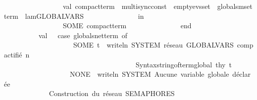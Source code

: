 \begin{isabellebody}
\ \ \ \ \ \ \ \ \ \ \ \ \ \ \ \ \ val\ compact{\isacharunderscore}{\kern0pt}term\ {\isacharequal}{\kern0pt}\ multisync{\isacharunderscore}{\kern0pt}const\ {\isachardollar}{\kern0pt}\ empty{\isacharunderscore}{\kern0pt}evs{\isacharunderscore}{\kern0pt}set\ {\isachardollar}{\kern0pt}\ globals{\isacharunderscore}{\kern0pt}mset{\isacharunderscore}{\kern0pt}term\ {\isachardollar}{\kern0pt}\ lam{\isacharunderscore}{\kern0pt}GLOBALVARS\isanewline
\ \ \ \ \ \ \ \ \ \ \ \ \ \ \ in\isanewline
\ \ \ \ \ \ \ \ \ \ \ \ \ \ \ \ \ SOME\ compact{\isacharunderscore}{\kern0pt}term\isanewline
\ \ \ \ \ \ \ \ \ \ \ \ \ \ \ end{\isacharparenright}{\kern0pt}\isanewline
\ \ \ \ \ \ \ \ \ \ \isanewline
\ \ \ \ \ \ \ \ \ \ val\ {\isacharunderscore}{\kern0pt}\ {\isacharequal}{\kern0pt}\ {\isacharparenleft}{\kern0pt}case\ globals{\isacharunderscore}{\kern0pt}net{\isacharunderscore}{\kern0pt}term\ of\isanewline
\ \ \ \ \ \ \ \ \ \ \ \ \ \ \ \ \ \ \ \ SOME\ t\ {\isacharequal}{\kern0pt}{\isachargreater}{\kern0pt}\ writeln\ {\isacharparenleft}{\kern0pt}{\isachardoublequote}{\kern0pt}{\isacharbrackleft}{\kern0pt}SYSTEM{\isacharbrackright}{\kern0pt}\ réseau\ GLOBALVARS\ compactifié\ {\isacharcolon}{\kern0pt}{\isacharbackslash}{\kern0pt}n\ \ {\isachardoublequote}{\kern0pt}\ {\isacharcircum}{\kern0pt}\isanewline
\ \ \ \ \ \ \ \ \ \ \ \ \ \ \ \ \ \ \ \ \ \ \ \ \ \ \ \ \ \ \ \ \ \ \ \ \ \ Syntax{\isachardot}{\kern0pt}string{\isacharunderscore}{\kern0pt}of{\isacharunderscore}{\kern0pt}term{\isacharunderscore}{\kern0pt}global\ thy{\isacharprime}{\kern0pt}\ t{\isacharparenright}{\kern0pt}\isanewline
\ \ \ \ \ \ \ \ \ \ \ \ \ \ \ \ \ \ {\isacharbar}{\kern0pt}\ NONE\ {\isacharequal}{\kern0pt}{\isachargreater}{\kern0pt}\ writeln\ {\isacharparenleft}{\kern0pt}{\isachardoublequote}{\kern0pt}{\isacharbrackleft}{\kern0pt}SYSTEM{\isacharbrackright}{\kern0pt}\ Aucune\ variable\ globale\ déclarée{\isachardoublequote}{\kern0pt}{\isacharparenright}{\kern0pt}{\isacharparenright}{\kern0pt}\isanewline
\ \ \ \ \ \ \ \ \ \ \isanewline
\ \ \ \ \ \ \ \ \ \ \isanewline
\isanewline
\ \ \ \ \ \ \ \ \ \ {\isacharparenleft}{\kern0pt}{\isacharasterisk}{\kern0pt}\ {}{\isachardot}{\kern0pt}\ \ Construction\ du\ réseau\ SEMAPHORES\ {\isacharminus}{\kern0pt}{\isacharminus}{\kern0pt}{\isacharminus}{\kern0pt}{\isacharminus}{\kern0pt}{\isacharminus}{\kern0pt}{\isacharminus}{\kern0pt}{\isacharminus}{\kern0pt}{\isacharminus}{\kern0pt}{\isacharminus}{\kern0pt}{\isacharminus}{\kern0pt}{\isacharminus}{\kern0pt}{\isacharminus}{\kern0pt}{\isacharminus}{\kern0pt}{\isacharminus}{\kern0pt}{\isacharminus}{\kern0pt}{\isacharminus}{\kern0pt}{\isacharminus}{\kern0pt}{\isacharminus}{\kern0pt}{\isacharminus}{\kern0pt}{\isacharminus}{\kern0pt}{\isacharminus}{\kern0pt}{\isacharminus}{\kern0pt}{\isacharminus}{\kern0pt}{\isacharminus}{\kern0pt}{\isacharminus}{\kern0pt}{\isacharminus}{\kern0pt}{\isacharminus}{\kern0pt}{\isacharminus}{\kern0pt}{\isacharminus}{\kern0pt}{\isacharminus}{\kern0pt}{\isacharminus}{\kern0pt}{\isacharminus}{\kern0pt}\ {\isacharasterisk}{\kern0pt}{\isacharparenright}{\kern0pt}\isanewline

\end{isabellebody}
